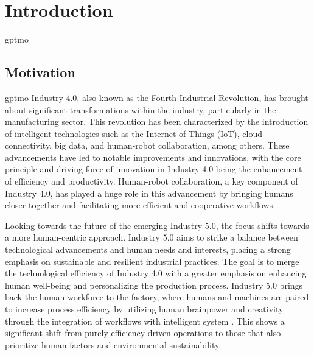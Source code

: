\chapter{Introduction}\gls*{gptmo}
\label{aufbau}

\section{Motivation}\gls*{gptmo}
Industry 4.0, also known as the Fourth Industrial Revolution, has brought about significant transformations within the industry, particularly in the manufacturing sector. This revolution has been characterized by the introduction of intelligent technologies such as the Internet of Things (IoT), cloud connectivity, big data, and human-robot collaboration, among others. These advancements have led to notable improvements and innovations, with the core principle and driving force of innovation in Industry 4.0 being the enhancement of efficiency and productivity. Human-robot collaboration, a key component of Industry 4.0, has played a huge role in this advancement by bringing humans closer together and facilitating more efficient and cooperative workflows. 

Looking towards the future of the emerging Industry 5.0, the focus shifts towards a more human-centric approach. Industry 5.0 aims to strike a balance between technological advancements and human needs and interests, placing a strong emphasis on sustainable and resilient industrial practices. The goal is to merge the technological efficiency of Industry 4.0 with a greater emphasis on enhancing human well-being and personalizing the production process. Industry 5.0 brings back the human workforce to the factory, where humans and machines are paired to increase 
process efficiency by utilizing human brainpower and creativity through the integration 
of workflows with intelligent system \parencite{hum1}.  This shows a significant shift from purely efficiency-driven operations to those that also prioritize human factors and environmental sustainability. 

